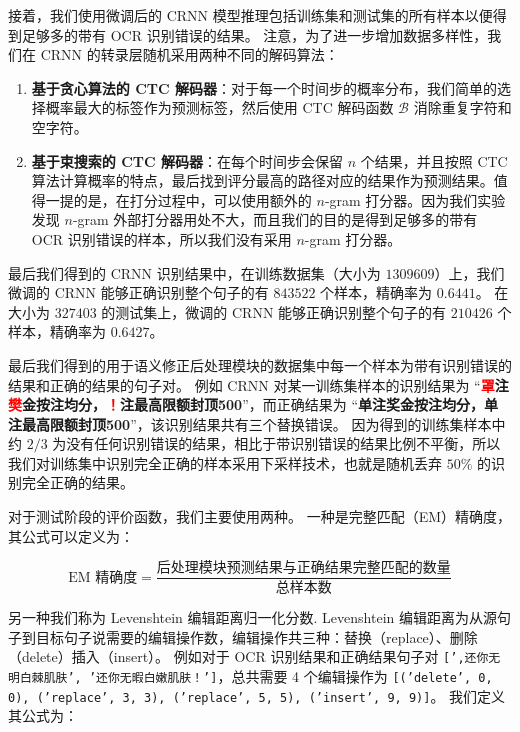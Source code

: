 接着，我们使用微调后的 CRNN 模型推理包括训练集和测试集的所有样本以便得到足够多的带有 OCR 识别错误的结果。
注意，为了进一步增加数据多样性，我们在 CRNN 的转录层随机采用两种不同的解码算法：

\begin{enumerate}[(1)]
	\item \textbf{基于贪心算法的 CTC 解码器}：对于每一个时间步的概率分布，我们简单的选择概率最大的标签作为预测标签，然后使用 CTC 解码函数 $\mathcal{B}$ 消除重复字符和空字符。
	\item \textbf{基于束搜索的 CTC 解码器}\cite{ctc_beam}：在每个时间步会保留 $n$ 个结果，并且按照 CTC 算法计算概率的特点，最后找到评分最高的路径对应的结果作为预测结果。值得一提的是，在打分过程中，可以使用额外的 $n$-gram 打分器。因为我们实验发现 $n$-gram 外部打分器用处不大，而且我们的目的是得到足够多的带有 OCR 识别错误的样本，所以我们没有采用 $n$-gram 打分器。
\end{enumerate}

最后我们得到的 CRNN 识别结果中，在训练数据集（大小为 $1309609$）上，我们微调的 CRNN 能够正确识别整个句子的有 $843522$ 个样本，精确率为 $0.6441$。
在大小为 $327403$ 的测试集上，微调的 CRNN 能够正确识别整个句子的有 $210426$ 个样本，精确率为 $0.6427$。

最后我们得到的用于语义修正后处理模块的数据集中每一个样本为带有识别错误的结果和正确的结果的句子对。
例如 CRNN 对某一训练集样本的识别结果为 “\textbf{\textcolor{red}{罩}注\textcolor{red}{樊}金按注均分，\textcolor{red}{！}注最高限额封顶500}”，而正确结果为 “\textbf{单注奖金按注均分，单注最高限额封顶500}”，该识别结果共有三个替换错误。
因为得到的训练集样本中约 $2/3$ 为没有任何识别错误的结果，相比于带识别错误的结果比例不平衡，所以我们对训练集中识别完全正确的样本采用下采样技术，也就是随机丢弃 $50\%$ 的识别完全正确的结果。

对于测试阶段的评价函数，我们主要使用两种。
一种是完整匹配（EM）精确度，其公式可以定义为：

\begin{equation}
	\text{EM 精确度} = \frac{\text{后处理模块预测结果与正确结果完整匹配的数量}}{\text{总样本数}}
\end{equation}

另一种我们称为 Levenshtein 编辑距离\cite{levenshtein1966binary}归一化分数.
Levenshtein 编辑距离为从源句子到目标句子说需要的编辑操作数，编辑操作共三种：替换（replace）、删除（delete）插入（insert）。
例如对于 OCR 识别结果和正确结果句子对 \texttt{[',还你无明白棘肌肤', '还你无暇白嫩肌肤！']}，总共需要 4 个编辑操作为 \texttt{[('delete', 0, 0), ('replace', 3, 3), ('replace', 5, 5), ('insert', 9, 9)]}。
我们定义其公式为：

